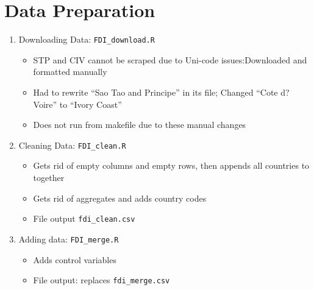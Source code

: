 \documentclass{article}
\begin{document}
\section{Data Preparation}
\begin{enumerate}
	\item Downloading Data: \texttt{FDI\_download.R}
		\begin{itemize}
			\item{STP and CIV cannot be scraped due to Uni-code issues:Downloaded and formatted manually}
			\item{Had to rewrite ``Sao Tao and Principe'' in its file; Changed ``Cote d?Voire'' to ``Ivory Coast''}
			\item{Does not run from makefile due to these manual changes}
		\end{itemize}
	\item Cleaning Data: \texttt{FDI\_clean.R}
		\begin{itemize}
			\item{Gets rid of empty columns and empty rows, then appends all countries to together}
			\item{Gets rid of aggregates and adds country codes}
			\item File output \texttt{fdi\_clean.csv}
		\end{itemize}
	\item Adding data: \texttt{FDI\_merge.R}
		\begin{itemize}
			\item{Adds control variables}
			\item File output: replaces \texttt{fdi\_merge.csv} 
		\end{itemize}
		
\end{enumerate}
\end{document}
